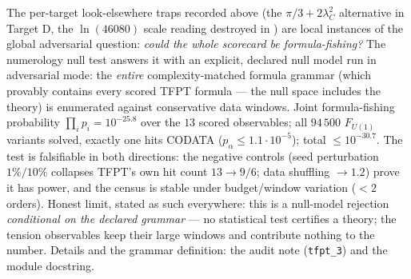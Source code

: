 \begin{winbox}
The per-target look-elsewhere traps recorded above (the $\pi/3+2\lambda_C^2$ alternative in Target D, the
$\ln(46080)$ scale reading destroyed in ) are local instances of the global
adversarial question: \emph{could the whole scorecard be formula-fishing?} The numerology null test answers
it with an explicit, declared null model run in adversarial mode: the \emph{entire} complexity-matched
formula grammar (which provably contains every scored TFPT formula --- the null space includes the theory)
is enumerated against conservative data windows. Joint formula-fishing probability $\prod_i p_i=10^{-25.8}$
over the $13$ scored observables; all $94\,500$ $F_{U(1)}$ variants solved, exactly one hits CODATA
($p_\alpha\le1.1{\cdot}10^{-5}$); total $\le10^{-30.7}$. The test is falsifiable in both directions: the
negative controls (seed perturbation $1\%/10\%$ collapses TFPT's own hit count $13\to9/6$; data shuffling
$\to1.2$) prove it has power, and the census is stable under budget/window variation ($<2$ orders). Honest
limit, stated as such everywhere: this is a null-model rejection \emph{conditional on the declared grammar}
--- no statistical test certifies a theory; the tension observables keep their large windows and contribute
nothing to the number. Details and the grammar definition: the audit note (\texttt{tfpt\_3}) and the module
docstring.
\end{winbox}

